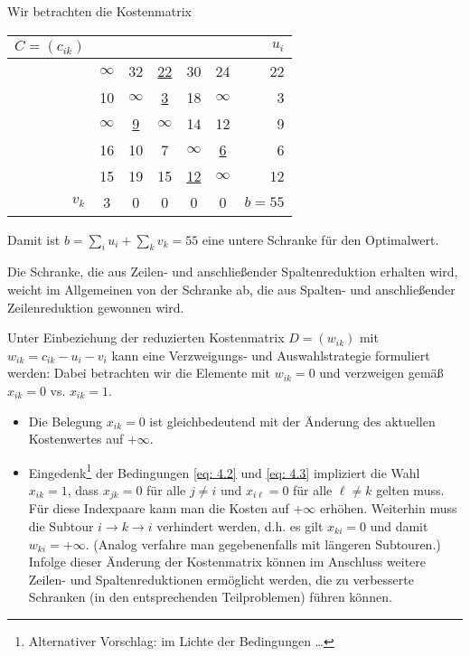 \begin{beispiel} \label{beispiel: 4.3}
	Wir betrachten die Kostenmatrix
	
	\begin{center}
		\begin{tabular}{r|ccccc|r}
			$C = (c_{ik})$ &          &    &    &    &    & $u_i$ \\ \hline 
			& $\infty$ & 32 & \underline{22} & 30 & 24 & 22 \\
			& 10       & $\infty$ & \underline{3} & 18 & $\infty$ & 3\\
			& $\infty$ & \underline{9} & $\infty$ & 14 & 12 & 9\\
			& 16 & 10 & 7 & $\infty$ & \underline{6} & 6 \\
			& 15 & 19 & 15 & \underline{12} & $\infty$ & 12 \\ \hline
			$v_k$ & 3 & 0 & 0 & 0 & 0 & $b = 55$ \\ 
		\end{tabular}
	\end{center}

	Damit ist $b = \sum_i u_i + \sum_k v_k = 55$ eine untere Schranke für den Optimalwert.
\end{beispiel}

\begin{bemerkung}
	Die Schranke, die aus Zeilen- und anschließender Spaltenreduktion erhalten wird, weicht im Allgemeinen von der Schranke ab, die aus Spalten- und anschließender Zeilenreduktion gewonnen wird.
\end{bemerkung}

Unter Einbeziehung der reduzierten Kostenmatrix $D = (w_{ik})$ mit $w_{ik} = c_{ik} - u_i - v_i$ kann eine Verzweigungs- und Auswahlstrategie formuliert werden:
Dabei betrachten wir die Elemente mit $w_{ik} = 0$ und verzweigen gemäß $x_{ik} = 0$ vs. $x_{ik} = 1$.
\begin{itemize}
	\item Die Belegung $x_{ik} = 0$ ist gleichbedeutend mit der Änderung des aktuellen Kostenwertes auf $+\infty$.
	\item Eingedenk\footnote{Alternativer Vorschlag: im Lichte der Bedingungen \dots} der Bedingungen \eqref{eq: 4.2} und \eqref{eq: 4.3} impliziert die Wahl $x_{ik} = 1$, dass $x_{jk} = 0$ für alle $j \neq i$ und $x_{i\ell} = 0$ für alle $\ell \neq k$ gelten muss. Für diese Indexpaare kann man die Kosten auf $+\infty$ erhöhen. Weiterhin muss die Subtour $i \to k \to i$ verhindert werden, d.h. es gilt $x_{ki} = 0$ und damit $w_{ki} = +\infty$. (Analog verfahre man gegebenenfalls mit längeren Subtouren.)
	Infolge dieser Änderung der Kostenmatrix können im Anschluss weitere Zeilen- und Spaltenreduktionen ermöglicht werden, die zu verbesserte Schranken (in den entsprechenden Teilproblemen) führen können.
\end{itemize}

